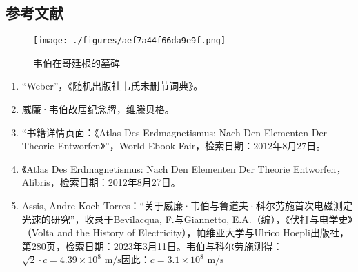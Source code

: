 \subsection{参考文献}  
\begin{figure}[ht]
\centering
\texttt{[image: ./figures/aef7a44f66da9e9f.png]}
\caption{韦伯在哥廷根的墓碑} \label{fig_Eduard_5}
\end{figure}
\begin{enumerate}
\item “Weber”，《随机出版社韦氏未删节词典》。  
\item 威廉·韦伯故居纪念牌，维滕贝格。  
\item “书籍详情页面：《Atlas Des Erdmagnetismus: Nach Den Elementen Der Theorie Entworfen》”，World Ebook Fair，检索日期：2012年8月27日。  
\item 《Atlas Des Erdmagnetismus: Nach Den Elementen Der Theorie Entworfen，Alibris，检索日期：2012年8月27日。  
\item Assis, Andre Koch Torres：“关于威廉·韦伯与鲁道夫·科尔劳施首次电磁测定光速的研究”，收录于Bevilacqua, F.与Giannetto, E.A.（编），《伏打与电学史》（Volta and the History of Electricity），帕维亚大学与Ulrico Hoepli出版社，第280页，检索日期：2023年3月11日。韦伯与科尔劳施测得：\(\sqrt{2} \cdot c = 4.39 \times 10^8 \text{ m/s}\)因此：\(c = 3.1 \times 10^8 \text{ m/s}\)
\end{enumerate}